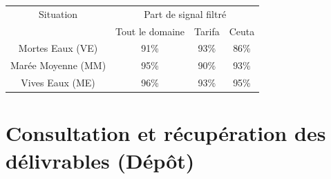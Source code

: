 \documentclass[a4paper,11pt]{report}
\begin{document}
\begin{table}
        \centering
        \begin{tabular}{|c|c|c|c|}
                \hline
                Situation & \multicolumn{3}{c|}{Part de signal filtré}\\
                & Tout le domaine & Tarifa & Ceuta\\
                \hline
                Mortes Eaux (VE) &  91\% & 93\% & 86\%\\
                Marée Moyenne (MM) & 95\% & 90\% & 93\%  \\
                Vives Eaux (ME) & 96\% & 93\% & 95\% \\
                \hline
        \end{tabular}
        \label{tab_stats_MIV}
\end{table}

\section{Consultation et récupération des délivrables (Dépôt)}
\end{document}
